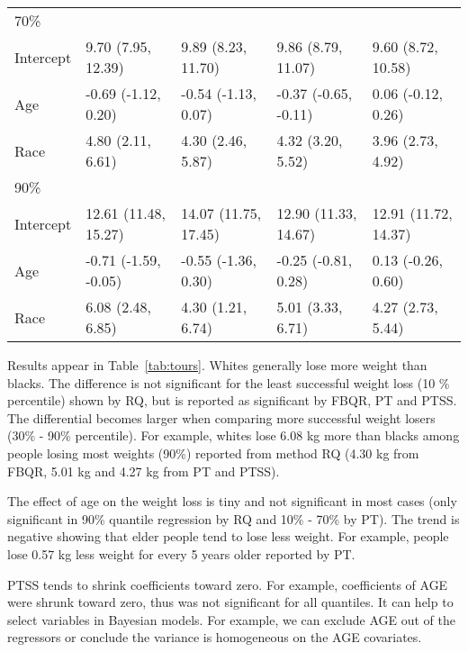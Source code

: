 \documentclass[12pt]{article}
\begin{document}
\begin{table}[h]
\begin{tabular}[tb]{lllll}
    \hline
    70\%      &                      &                      &                      &                      \\
    Intercept & 9.70 (7.95, 12.39)   & 9.89 (8.23, 11.70)   & 9.86 (8.79, 11.07)   & 9.60 (8.72, 10.58)   \\
    Age       & -0.69 (-1.12, 0.20)  & -0.54 (-1.13, 0.07)  & -0.37 (-0.65, -0.11) & 0.06 (-0.12, 0.26)   \\
    Race      & 4.80 (2.11, 6.61)    & 4.30 (2.46, 5.87)    & 4.32 (3.20, 5.52)    & 3.96 (2.73, 4.92)    \\
    \hline
    90\%      &                      &                      &                      &                      \\
    Intercept & 12.61 (11.48, 15.27) & 14.07 (11.75, 17.45) & 12.90 (11.33, 14.67) & 12.91 (11.72, 14.37) \\
    Age       & -0.71 (-1.59, -0.05) & -0.55 (-1.36, 0.30)  & -0.25 (-0.81, 0.28)  & 0.13 (-0.26, 0.60)   \\
    Race      & 6.08 (2.48, 6.85)    & 4.30 (1.21, 6.74)    & 5.01 (3.33, 6.71)    & 4.27 (2.73, 5.44)    \\
    \bottomrule
  \end{tabular}
\end{table}

Results appear in Table~\ref{tab:tours}.  Whites generally lose more
weight than blacks. The difference is not significant for the least
successful weight loss (10 \% percentile) shown by RQ, but is reported
as significant by FBQR, PT and PTSS. The differential becomes larger
when comparing more successful weight losers (30\% - 90\%
percentile). For example, whites lose 6.08 kg more than blacks among
people losing most weights (90\%) reported from method RQ (4.30 kg
from FBQR, 5.01 kg and 4.27 kg from PT and PTSS).

The effect of age on the weight loss is tiny and not significant in
most cases (only significant in 90\% quantile regression by RQ and
10\% - 70\% by PT). The trend is negative showing that elder people
tend to lose less weight. For example, people lose 0.57 kg less weight
for every 5 years older reported by PT.

PTSS tends to shrink coefficients toward zero. For example,
coefficients of AGE were shrunk toward zero, thus was not significant
for all quantiles. It can help to select variables in Bayesian
models. For example, we can exclude AGE out of the regressors or
conclude the variance is homogeneous on the AGE covariates.
\end{document}
